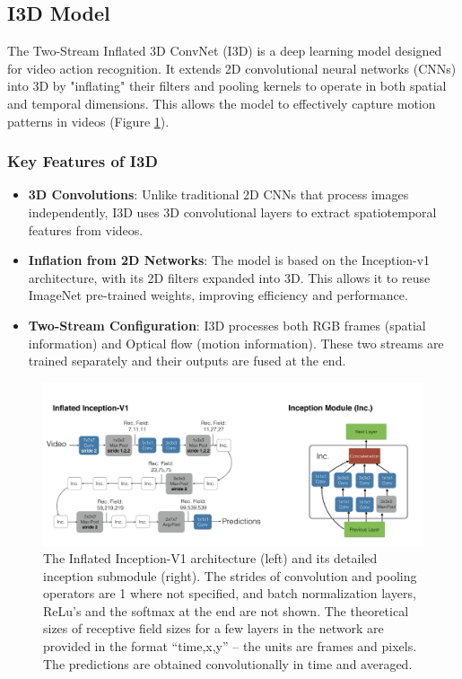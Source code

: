 \documentclass{article}
\begin{document}
\subsection{I3D Model}
The Two-Stream Inflated 3D ConvNet (I3D) \cite{carreira2018quovadisactionrecognition} is a deep learning model designed for video action recognition. It extends 2D convolutional neural networks (CNNs) into 3D by "inflating" their filters and pooling kernels to operate in both spatial and temporal dimensions. This allows the model to effectively capture motion patterns in videos (Figure \ref{fig:i3d}).
\subsubsection{Key Features of I3D}
\begin{itemize}
    \item \textbf{3D Convolutions}: Unlike traditional 2D CNNs that process images independently, I3D uses 3D convolutional layers to extract spatiotemporal features from videos.
    \item \textbf{Inflation from 2D Networks}: The model is based on the Inception-v1 architecture, with its 2D filters expanded into 3D. This allows it to reuse ImageNet pre-trained weights, improving efficiency and performance.
    \item \textbf{Two-Stream Configuration}: I3D processes both RGB frames (spatial information) and Optical flow (motion information). These two streams are trained separately and their outputs are fused at the end.
\end{itemize}

\begin{figure}[h]
    \centering
    \includegraphics[width=0.8\linewidth]{figs/i3d.png}
    \caption{The Inflated Inception-V1 architecture (left) and its detailed inception submodule (right). The strides of convolution and pooling
operators are 1 where not specified, and batch normalization layers, ReLu’s and the softmax at the end are not shown. The theoretical
sizes of receptive field sizes for a few layers in the network are provided in the format “time,x,y” – the units are frames and pixels. The
predictions are obtained convolutionally in time and averaged.\cite{carreira2018quovadisactionrecognition}}
    \label{fig:i3d}
\end{figure}
\end{document}
